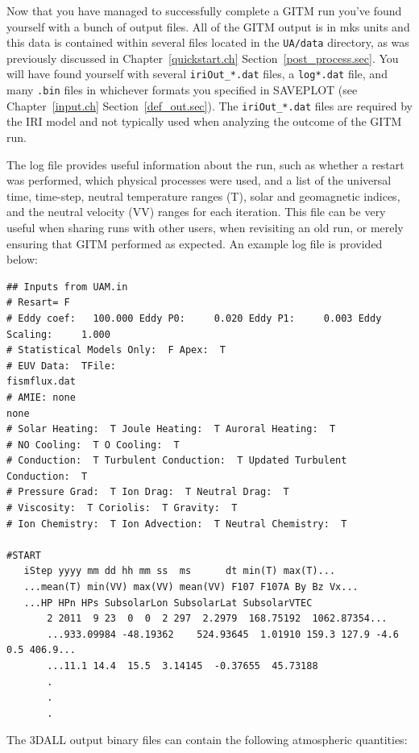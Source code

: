 Now that you have managed to successfully complete a GITM run you've found yourself with a bunch of output files.  All of the GITM output is in mks units and this data is contained within several files located in the {\tt UA/data} directory, as was previously discussed in Chapter~\ref{quickstart.ch} Section~\ref{post_process.sec}.  You will have found yourself with several {\tt iriOut\_*.dat} files, a {\tt log*.dat} file, and many {\tt .bin} files in whichever formats you specified in SAVEPLOT (see Chapter~\ref{input.ch} Section~\ref{def_out.sec}).  The {\tt iriOut\_*.dat} files are required by the IRI model and not typically used when analyzing the outcome of the GITM run.

The log file provides useful information about the run, such as whether a restart was performed, which physical processes were used, and a list of the universal time, time-step, neutral temperature ranges (T), solar and geomagnetic indices, and the neutral velocity (VV) ranges for each iteration.  This file can be very useful when sharing runs with other users, when revisiting an old run, or merely ensuring that GITM performed as expected.  An example log file is provided below:

\begin{verbatim}
## Inputs from UAM.in
# Resart= F
# Eddy coef:   100.000 Eddy P0:     0.020 Eddy P1:     0.003 Eddy Scaling:     1.000
# Statistical Models Only:  F Apex:  T
# EUV Data:  TFile: 
fismflux.dat                                                                                        
# AMIE: none           
none                                                                                                
# Solar Heating:  T Joule Heating:  T Auroral Heating:  T
# NO Cooling:  T O Cooling:  T
# Conduction:  T Turbulent Conduction:  T Updated Turbulent Conduction:  T
# Pressure Grad:  T Ion Drag:  T Neutral Drag:  T
# Viscosity:  T Coriolis:  T Gravity:  T
# Ion Chemistry:  T Ion Advection:  T Neutral Chemistry:  T
 
#START
   iStep yyyy mm dd hh mm ss  ms      dt min(T) max(T)...
   ...mean(T) min(VV) max(VV) mean(VV) F107 F107A By Bz Vx...
   ...HP HPn HPs SubsolarLon SubsolarLat SubsolarVTEC
       2 2011  9 23  0  0  2 297  2.2979  168.75192  1062.87354...
       ...933.09984 -48.19362    524.93645  1.01910 159.3 127.9 -4.6  0.5 406.9...
       ...11.1 14.4  15.5  3.14145  -0.37655  45.73188
       .
       .
       .
\end{verbatim}

The 3DALL output binary files can contain the following atmospheric quantities:

